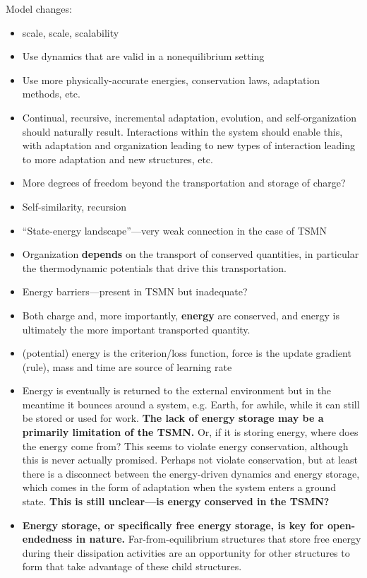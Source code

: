 \documentclass[12pt,letterpaper]{article}
\begin{document}
Model changes:
\begin{itemize}
\item scale, scale, scalability
\item Use dynamics that are valid in a nonequilibrium setting
\item Use more physically-accurate energies, conservation laws, adaptation methods, etc.
\item Continual, recursive, incremental adaptation, evolution, and self-organization should naturally result. Interactions within the system should enable this, with adaptation and organization leading to new types of interaction leading to more adaptation and new structures, etc.
\item More degrees of freedom beyond the transportation and storage of charge?
\item Self-similarity, recursion
\item ``State-energy landscape''---very weak connection in the case of TSMN
\item Organization \textbf{depends} on the transport of conserved quantities, in particular the thermodynamic potentials that drive this transportation.
\item Energy barriers---present in TSMN but inadequate?
\item Both charge and, more importantly, \textbf{energy} are conserved, and energy is ultimately the more important transported quantity.
\item (potential) energy is the criterion/loss function, force is the update gradient (rule), mass and time are source of learning rate
\item Energy is eventually is returned to the external environment but in the meantime it bounces around a system, e.g. Earth, for awhile, while it can still be stored or used for work. \textbf{The lack of energy storage may be a primarily limitation of the TSMN.} Or, if it is storing energy, where does the energy come from? This seems to violate energy conservation, although this is never actually promised. Perhaps not violate conservation, but at least there is a disconnect between the energy-driven dynamics and energy storage, which comes in the form of adaptation when the system enters a ground state. \textbf{This is still unclear---is energy conserved in the TSMN?}
\item \textbf{Energy storage, or specifically free energy storage, is key for open-endedness in nature.} Far-from-equilibrium structures that store free energy during their dissipation activities are an opportunity for other structures to form that take advantage of these child structures.

\end{itemize}
\end{document}
